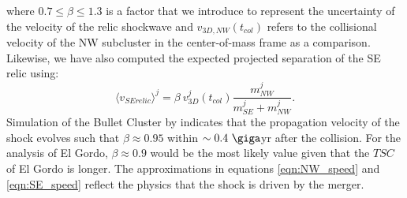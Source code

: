 where $0.7 \leq \beta \leq 1.3$ is a factor that we introduce to represent the
uncertainty of the velocity of the relic shockwave and $v_{3D, NW}(t_{col})$ refers to the collisional velocity of
the NW subcluster in the center-of-mass frame as a comparison. 
Likewise, we have also computed the expected projected separation of the SE
relic using:  
\begin{equation}
	\label{eqn:SE_speed}
	\langle v_{SE relic} \rangle^j = \beta~v^j_{3D}(t_{col}) \frac{m^j_{NW}}{m^j_{SE} + m^j_{NW}}. 
\end{equation}
Simulation of the Bullet Cluster by \cite{Springel2007} indicates that the
propagation velocity of the shock evolves such that $\beta \approx 0.95$ within
$\sim 0.4~\giga$yr after the collision. For the analysis of El Gordo,
$\beta \approx 0.9$ would be the most likely value given that the $TSC$ of
El Gordo is longer. The approximations in equations
\ref{eqn:NW_speed} and \ref{eqn:SE_speed} reflect the physics that the
shock is driven by the merger. 

\label{sec:positionprior}

